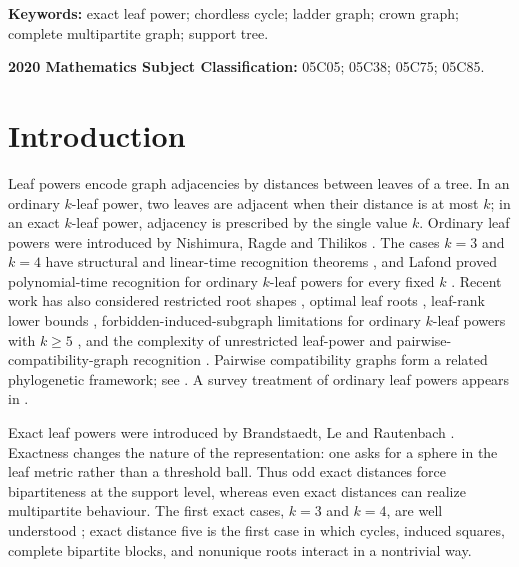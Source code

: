 \documentclass[11pt]{article}
\theoremstyle{definition}
\begin{document}
\noindent\textbf{Keywords:} exact leaf power; chordless cycle; ladder graph; crown graph; complete multipartite graph; support tree.

\noindent\textbf{2020 Mathematics Subject Classification:} 05C05; 05C38; 05C75; 05C85.

\bigskip

\section{Introduction}

Leaf powers encode graph adjacencies by distances between leaves of a tree.  In an ordinary $k$-leaf power, two leaves are adjacent when their distance is at most $k$; in an exact $k$-leaf power, adjacency is prescribed by the single value $k$.  Ordinary leaf powers were introduced by Nishimura, Ragde and Thilikos \cite{NRT2002}.  The cases $k=3$ and $k=4$ have structural and linear-time recognition theorems \cite{BLS2006,BLS2008}, and Lafond proved polynomial-time recognition for ordinary $k$-leaf powers for every fixed $k$ \cite{Lafond2022,Lafond2023}.  Recent work has also considered restricted root shapes \cite{BergougnouxHogemoTelleVatshelle2022}, optimal leaf roots \cite{LeRosenke2024}, leaf-rank lower bounds \cite{Hogemo2024}, forbidden-induced-subgraph limitations for ordinary $k$-leaf powers with $k\ge5$ \cite{DupreLafondNdiayeVetta2025}, and the complexity of unrestricted leaf-power and pairwise-compatibility-graph recognition \cite{DupreLafondNdiaye2026}.  Pairwise compatibility graphs form a related phylogenetic framework; see \cite{CalamoneriSinaimeri2016,CalamoneriMontiSinaimeri2025}.  A survey treatment of ordinary leaf powers appears in \cite{RosenkeLeBrandstaedt2021}.

Exact leaf powers were introduced by Brandstaedt, Le and Rautenbach \cite{BLR2010}.  Exactness changes the nature of the representation: one asks for a sphere in the leaf metric rather than a threshold ball.  Thus odd exact distances force bipartiteness at the support level, whereas even exact distances can realize multipartite behaviour.  The first exact cases, $k=3$ and $k=4$, are well understood \cite{BLR2010}; exact distance five is the first case in which cycles, induced squares, complete bipartite blocks, and nonunique roots interact in a nontrivial way.
\end{document}

